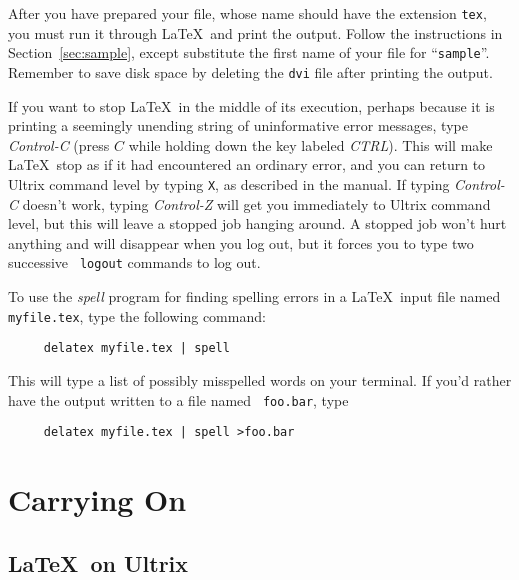 After you have prepared your file, whose name should have the extension
{\tt tex}, you must run it through \LaTeX\ and print the output.
Follow the instructions in Section~\ref{sec:sample}, except substitute
the first name of your file for ``\mbox{\tt sample}''.  Remember to
save disk space by deleting the {\tt dvi} file after printing the
output.



If you want to stop \LaTeX\ in the middle of its execution, perhaps
because it is printing a seemingly unending string of uninformative
error messages, type {\em Control-C\/} (press $C$ while holding down
the key labeled {\em CTRL\/}).  This will make \LaTeX\ stop as if it
had encountered an ordinary error, and you can return to Ultrix command
level by typing {\tt X}, as described in the manual.  If typing {\em
Control-C\/} doesn't work, typing {\em Control-Z\/} will get you
immediately to Ultrix command level, but this will leave a stopped job
hanging around.  A stopped job won't hurt anything and will disappear
when you log out, but it forces you to type two successive \mbox{\tt
logout} commands to log out.

To use the {\em spell\/} program for finding spelling errors in a
\LaTeX\ input file named \mbox{\tt myfile.tex}, type the following
command:
\begin{verbatim}
     delatex myfile.tex | spell
\end{verbatim}
This will type a list of possibly misspelled words on your terminal.
If you'd rather have the output written to a file named \mbox{\tt
foo.bar}, type
\begin{verbatim}
     delatex myfile.tex | spell >foo.bar
\end{verbatim}


\section{Carrying On}

\subsection{\LaTeX\ on Ultrix} \label{sec:op-system}

